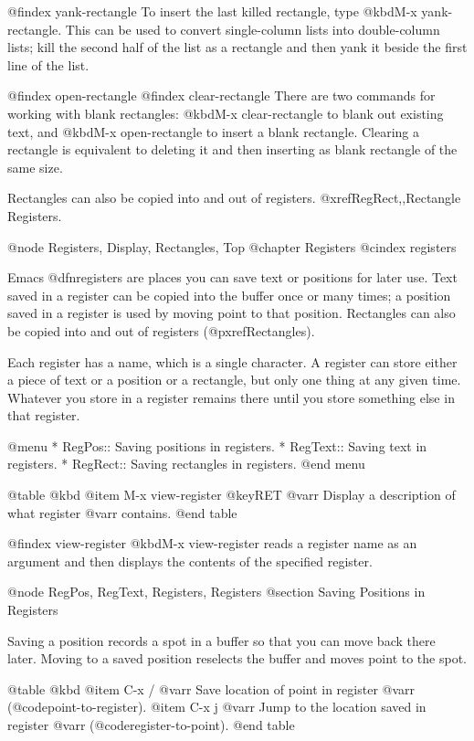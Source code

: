 {{{{{{{{@findex yank-rectangle
  To insert the last killed rectangle, type @kbd{M-x yank-rectangle}.
This can be used to convert single-column lists into double-column
lists; kill the second half of the list as a rectangle and then
yank it beside the first line of the list.

@findex open-rectangle
@findex clear-rectangle
  There are two commands for working with blank rectangles: @kbd{M-x
clear-rectangle} to blank out existing text, and @kbd{M-x open-rectangle}
to insert a blank rectangle.  Clearing a rectangle is equivalent to
deleting it and then inserting as blank rectangle of the same size.

  Rectangles can also be copied into and out of registers.
@xref{RegRect,,Rectangle Registers}.

@node Registers, Display, Rectangles, Top
@chapter Registers
@cindex registers

  Emacs @dfn{registers} are places you can save text or positions for
later use.  Text saved in a register can be copied into the buffer
once or many times; a position saved in a register is used by moving
point to that position.  Rectangles can also be copied into and out of
registers (@pxref{Rectangles}).

  Each register has a name, which is a single character.  A register can
store either a piece of text or a position or a rectangle, but only one
thing at any given time.  Whatever you store in a register remains
there until you store something else in that register.

@menu
* RegPos::    Saving positions in registers.
* RegText::   Saving text in registers.
* RegRect::   Saving rectangles in registers.
@end menu

@table @kbd
@item M-x view-register @key{RET} @var{r}
Display a description of what register @var{r} contains.
@end table

@findex view-register
  @kbd{M-x view-register} reads a register name as an argument and then
displays the contents of the specified register.

@node RegPos, RegText, Registers, Registers
@section Saving Positions in Registers

  Saving a position records a spot in a buffer so that you can move
back there later.  Moving to a saved position reselects the buffer
and moves point to the spot.

@table @kbd
@item C-x / @var{r}
Save location of point in register @var{r} (@code{point-to-register}).
@item C-x j @var{r}
Jump to the location saved in register @var{r} (@code{register-to-point}).
@end table

}}}}}}}}
